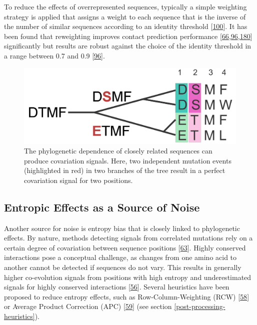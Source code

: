 \documentclass[11pt,a4paper,twoside]{book}
\theoremstyle{definition}
\theoremstyle{definition}
\theoremstyle{remark}
\begin{document}
To reduce the effects of overrepresented sequences, typically a simple
weighting strategy is applied that assigns a weight to each sequence
that is the inverse of the number of similar sequences according to an
identity threshold {[}\protect\hyperlink{ref-Stein2015a}{100}{]}. It has
been found that reweighting improves contact prediction performance
{[}\protect\hyperlink{ref-Jones2012}{66},\protect\hyperlink{ref-Morcos2011}{96},\protect\hyperlink{ref-Buslje2009}{180}{]}
significantly but results are robust against the choice of the identity
threshold in a range between 0.7 and 0.9
{[}\protect\hyperlink{ref-Morcos2011}{96}{]}.






\begin{figure}

{\centering \includegraphics[width=0.6\linewidth]{img/intro/phylogenetic_effect} 

}

\caption{The phylogenetic dependence of closely
related sequences can produce covariation signals. Here, two independent
mutation events (highlighted in red) in two branches of the tree result
in a perfect covariation signal for two positions.}\label{fig:phylogenetic-effect}
\end{figure}

\subsection{Entropic Effects as a Source of
Noise}\label{entropic-effects-as-a-source-of-noise}

Another source for noise is entropy bias that is closely linked to
phylogenetic effects. By nature, methods detecting signals from
correlated mutations rely on a certain degree of covariation between
sequence positions {[}\protect\hyperlink{ref-Burger2010}{63}{]}. Highly
conserved interactions pose a conceptual challenge, as changes from one
amino acid to another cannot be detected if sequences do not vary. This
results in generally higher co-evolution signals from positions with
high entropy and underestimated signals for highly conserved
interactions {[}\protect\hyperlink{ref-Fodor2004}{56}{]}. Several
heuristics have been proposed to reduce entropy effects, such as
Row-Column-Weighting (RCW)
{[}\protect\hyperlink{ref-Gouveia_Oliveira2007}{58}{]} or Average
Product Correction (APC) {[}\protect\hyperlink{ref-Dunn2008}{59}{]} (see
section \ref{post-processing-heuristics}).
\end{document}
